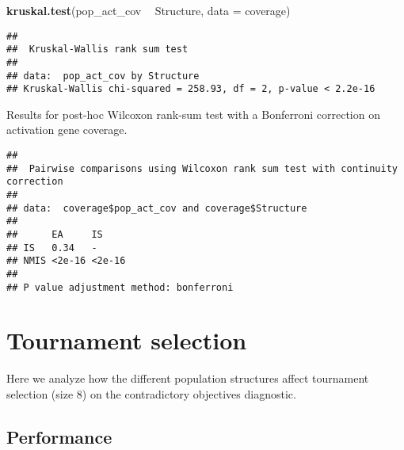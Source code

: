 \documentclass[]{book}
\newenvironment{Shaded}{\begin{snugshade}}{\end{snugshade}}
\newcommand{\DataTypeTok}[1]{\textcolor[rgb]{0.13,0.29,0.53}{#1}}
\newcommand{\KeywordTok}[1]{\textcolor[rgb]{0.13,0.29,0.53}{\textbf{#1}}}
\newcommand{\NormalTok}[1]{#1}
\newcommand{\OperatorTok}[1]{\textcolor[rgb]{0.81,0.36,0.00}{\textbf{#1}}}
\newcommand{\OtherTok}[1]{\textcolor[rgb]{0.56,0.35,0.01}{#1}}
\newcommand{\StringTok}[1]{\textcolor[rgb]{0.31,0.60,0.02}{#1}}
\begin{document}
\begin{Shaded}
\begin{Highlighting}[]
\KeywordTok{kruskal.test}\NormalTok{(pop_act_cov }\OperatorTok{~}\StringTok{ }\NormalTok{Structure, }\DataTypeTok{data =}\NormalTok{ coverage)}
\end{Highlighting}
\end{Shaded}

\begin{verbatim}
## 
##  Kruskal-Wallis rank sum test
## 
## data:  pop_act_cov by Structure
## Kruskal-Wallis chi-squared = 258.93, df = 2, p-value < 2.2e-16
\end{verbatim}

Results for post-hoc Wilcoxon rank-sum test with a Bonferroni correction on activation gene coverage.

\begin{Shaded}
\end{Shaded}

\begin{verbatim}
## 
##  Pairwise comparisons using Wilcoxon rank sum test with continuity correction 
## 
## data:  coverage$pop_act_cov and coverage$Structure 
## 
##      EA     IS    
## IS   0.34   -     
## NMIS <2e-16 <2e-16
## 
## P value adjustment method: bonferroni
\end{verbatim}

\hypertarget{tournament-selection-3}{%
\section{Tournament selection}\label{tournament-selection-3}}

Here we analyze how the different population structures affect tournament selection (size 8) on the contradictory objectives diagnostic.

\hypertarget{performance-1}{%
\subsection{Performance}\label{performance-1}}
\end{document}
